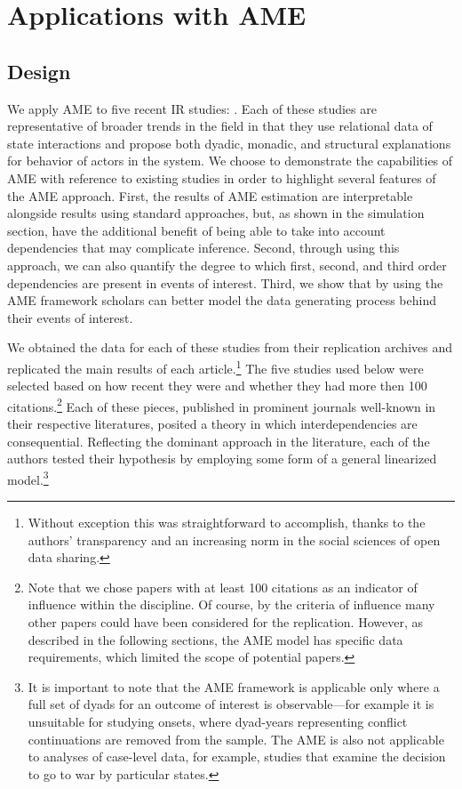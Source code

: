 \section{\textbf{Applications with AME}}

\subsection{Design}

We apply AME to five recent IR studies: \citet{reiter:stam:2003, mcdonald:2004,  rose:2004, weeks:2012, gibler:2017}. Each of these studies are representative of broader trends in the field in that they use relational data of state interactions and propose both dyadic, monadic, and structural explanations for behavior of actors in the system. We choose to demonstrate the capabilities of AME with reference to existing studies in order to highlight several features of the AME approach. First, the results of AME estimation are interpretable alongside results using standard approaches, but, as shown in the simulation section, have the additional benefit of being able to take into account dependencies that may complicate inference. Second, through using this approach, we can also quantify the degree to which first, second, and third order dependencies are present in events of interest. Third, we show that by using the AME framework scholars can better model the data generating process behind their events of interest.

We obtained the data for each of these studies from their replication archives and replicated the main results of each article.\footnote{Without exception this was straightforward to accomplish, thanks to the authors' transparency and an increasing norm in the social sciences of open data sharing.} The five studies used below were selected based on how recent they were and whether they had more then 100 citations.\footnote{Note that we chose papers with at least 100 citations as an indicator of influence within the discipline. Of course, by the criteria of influence many other papers could have been considered for the replication. However, as described in the following sections, the AME model has specific data requirements, which limited the scope of potential papers.} Each of these pieces, published in prominent journals well-known in their respective literatures, posited a theory in which interdependencies are consequential. Reflecting the dominant approach in the literature, each of the authors tested their hypothesis by employing some form of a general linearized model.\footnote{It is important to note that the AME framework is applicable only where a full set of dyads for an outcome of interest is observable---for example it is unsuitable for studying onsets, where dyad-years representing conflict continuations are removed from the sample. The AME is also not applicable to analyses of case-level data, for example, studies that examine the decision to go to war by particular states.}

